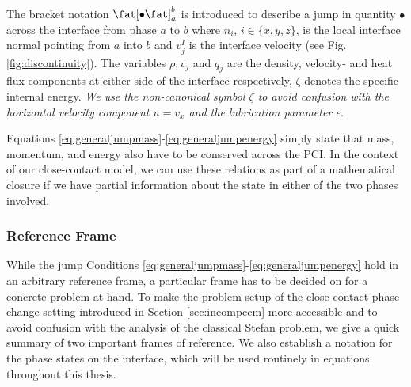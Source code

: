 


The bracket notation $\fat[ \bullet \fat]_{a}^{b}$ is introduced to describe a jump in quantity $\bullet$ across the interface from phase $a$ to $b$ where $n_i,\,i\in\{x,y,z\}$, is the local interface normal pointing from $a$ into $b$ and $v_j^I$ is the interface velocity (see Fig. \ref{fig:discontinuity}).  The variables $\rho, v_j$ and $q_j$ are the density, velocity- and heat flux components at either side of the interface respectively, $\zeta$ denotes the specific internal energy. \textit{We use the non-canonical symbol $\zeta$ to avoid confusion with the horizontal velocity component $u=v_x$ and the lubrication parameter $\epsilon$}.

Equations \ref{eq:generaljumpmass}-\ref{eq:generaljumpenergy} simply state that mass, momentum, and energy also have to be conserved across the \gls{PCI}. In the context of our close-contact model, we can use these relations as part of a mathematical closure if we have partial information about the state in either of the two phases involved. 


\subsubsection{Reference Frame}\label{sec:referenceframe}

While the jump Conditions \ref{eq:generaljumpmass}-\ref{eq:generaljumpenergy} hold in an arbitrary reference frame, a particular frame has to be decided on for a concrete problem at hand. To make the problem setup of the close-contact phase change setting introduced in Section \ref{sec:incompccm} more accessible and to avoid confusion with the analysis of the classical Stefan problem, we give a quick summary of two important frames of reference. We also establish a notation for the phase states on the interface, which will be used routinely in equations throughout this thesis. 


